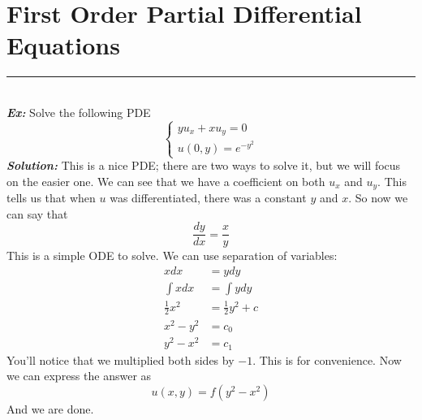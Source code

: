 \documentclass{article}
\begin{document}
\section{First Order Partial Differential Equations}
\hrule
\noindent\\
\noindent\textbf{\textit{Ex:}} Solve the following PDE
\[
\begin{cases*}
yu_{x} + xu_{y} = 0\\
u(0,y) = e^{-y^{2}}
\end{cases*}
\]
\indent \textbf{\textit{Solution:}} This is a nice PDE; there are two ways to solve it, but we will focus on the easier one. We can see that we have a coefficient on both $u_{x}$ and $u_{y}$. This tells us that when $u$ was differentiated, there was a constant $y$ and $x$. So now we can say that
\[
\frac{dy}{dx} = \frac{x}{y}
\]
\noindent This is a simple ODE to solve. We can use separation of variables:
\begin{align*}
xdx &= ydy\\
\int{x dx} &= \int{y dy}\\
\frac{1}{2}x^{2} &= \frac{1}{2}y^{2} + c\\
x^{2} - y^{2} &= c_{0}\\
y^{2} - x^{2} &= c_{1}
\end{align*}
\noindent You'll notice that we multiplied both sides by $-1$. This is for convenience. Now we can express the answer as
\[
u(x,y) = f(y^{2} - x^{2})
\]
\noindent And we are done.
\end{document}
